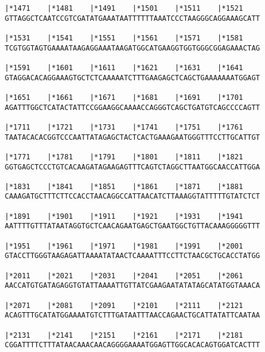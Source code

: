 \documentclass{article}
\begin{document}
\begin{Verbatim}
|*1471    |*1481    |*1491    |*1501    |*1511    |*1521    
GTTAGGCTCAATCCGTCGATATGAAATAATTTTTTAAATCCCTAAGGGCAGGAAAGCATT
                                                            
|*1531    |*1541    |*1551    |*1561    |*1571    |*1581    
TCGTGGTAGTGAAAATAAGAGGAAATAAGATGGCATGAAGGTGGTGGGCGGAGAAACTAG
                                                            
|*1591    |*1601    |*1611    |*1621    |*1631    |*1641    
GTAGGACACAGGAAAGTGCTCTCAAAAATCTTTGAAGAGCTCAGCTGAAAAAAATGGAGT
                                                            
|*1651    |*1661    |*1671    |*1681    |*1691    |*1701    
AGATTTGGCTCATACTATTCCGGAAGGCAAAACCAGGGTCAGCTGATGTCAGCCCCAGTT
                                                            
|*1711    |*1721    |*1731    |*1741    |*1751    |*1761    
TAATACACACGGTCCCAATTATAGAGCTACTCACTGAAAGAATGGGTTTCCTTGCATTGT
                                                            
|*1771    |*1781    |*1791    |*1801    |*1811    |*1821    
GGTGAGCTCCCTGTCACAAGATAGAAGAGTTTCAGTCTAGGCTTAATGGCAACCATTGGA
                                                            
|*1831    |*1841    |*1851    |*1861    |*1871    |*1881    
CAAAGATGCTTTCTTCCACCTAACAGGCCATTAACATCTTAAAGGTATTTTTGTATCTCT
                                                            
|*1891    |*1901    |*1911    |*1921    |*1931    |*1941    
AATTTTGTTTATAATAGGTGCTCAACAGAATGAGCTGAATGGCTGTTACAAAGGGGGTTT
                                                            
|*1951    |*1961    |*1971    |*1981    |*1991    |*2001    
GTACCTTGGGTAAGAGATTAAAATATAACTCAAAATTTCCTTCTAACGCTGCACCTATGG
                                                            
|*2011    |*2021    |*2031    |*2041    |*2051    |*2061    
AACCATGTGATAGAGGTGTATTAAAATTGTTATCGAAGAATATATAGCATATGGTAAACA
                                                            
|*2071    |*2081    |*2091    |*2101    |*2111    |*2121    
ACAGTTTGCATATGGAAAATGTCTTTGATAATTTAACCAGAACTGCATTATATTCAATAA
                                                            
|*2131    |*2141    |*2151    |*2161    |*2171    |*2181    
CGGATTTTCTTTATAACAAACAACAGGGGAAAATGGAGTTGGCACACAGTGGATCACTTT
                                                            

\end{Verbatim}
\end{document}

